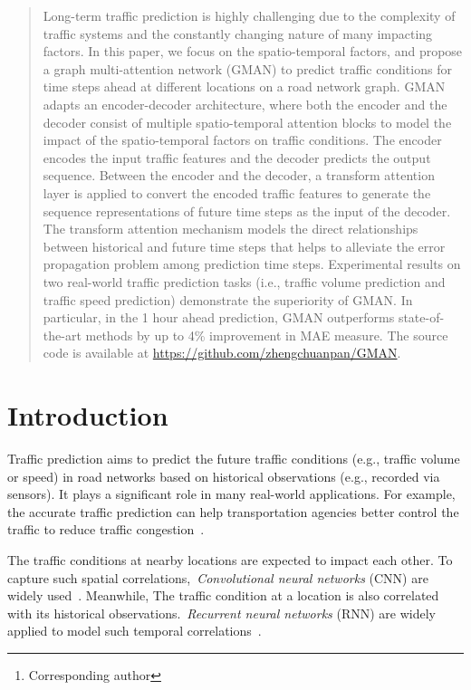 \documentclass[letterpaper]{article} \usepackage{aaai20}  \usepackage{times}  \usepackage{helvet} \usepackage{courier}  \usepackage[hyphens]{url}  \usepackage{graphicx} \usepackage{amsmath}
\author{Chuanpan Zheng\textsuperscript{\rm 1,2,3}, Xiaoliang Fan\textsuperscript{\rm 1,2,3}\thanks{Corresponding author}, Cheng Wang\textsuperscript{\rm 1,2,3}, Jianzhong Qi\textsuperscript{\rm 4}\\ \textsuperscript{\rm 1}Fujian Key Laboratory of Sensing and Computing for Smart Cities, Xiamen University, Xiamen, China\\
\textsuperscript{\rm 2}Digital Fujian Institute of Urban Traffic Big Data Research, Xiamen University, Xiamen, China\\ 
\textsuperscript{\rm 3}School of Informatics, Xiamen University, Xiamen, China\\ 
\textsuperscript{\rm 4}School of Computing and Information Systems, University of Melbourne, Melbourne, Australia\\zhengchuanpan@stu.xmu.edu.cn,
\{fanxiaoliang, cwang\}@xmu.edu.cn,
jianzhong.qi@unimelb.edu.au }
\begin{document}
	
\maketitle

\begin{abstract}
	Long-term traffic prediction is highly challenging due to the complexity of traffic systems and the constantly changing nature of many impacting factors. In this paper, we focus on the spatio-temporal factors, and propose a graph multi-attention network (GMAN) to predict traffic conditions for time steps ahead at different locations on a road network graph. GMAN adapts an encoder-decoder architecture, where both the encoder and the decoder consist of multiple spatio-temporal attention blocks to model the impact of the spatio-temporal factors on traffic conditions. The encoder encodes the input traffic features and the decoder predicts the output sequence. Between the encoder and the decoder, a transform attention layer is applied to convert the encoded traffic features to generate the sequence representations of future time steps as the input of the decoder. The transform attention mechanism models the direct relationships between historical and future time steps that helps to alleviate the error propagation problem among prediction time steps. Experimental results on two real-world traffic prediction tasks (i.e., traffic volume prediction and traffic speed prediction) demonstrate the superiority of GMAN. In particular, in the 1 hour ahead prediction, GMAN outperforms state-of-the-art methods by up to 4\% improvement in MAE measure. The source code is available at \url{https://github.com/zhengchuanpan/GMAN}.
\end{abstract}

\section{Introduction}

Traffic prediction aims to predict the future traffic conditions (e.g., traffic volume or speed) in road networks based on historical observations (e.g., recorded via sensors). It plays a significant role in many real-world applications. For example, the accurate traffic prediction can help transportation agencies better control the traffic to reduce traffic congestion~\cite{Lv-et-al:IJCAI2018,Zheng-et-al:TITS2019}.

The traffic conditions at nearby locations are expected to impact each other. To capture such spatial correlations,~\textit{Convolutional neural networks} (CNN) are widely used~\cite{Zhang-et-al:AAAI2017,Yao-et-al:AAAI2018,Yao-et-al:AAAI2019}. Meanwhile, The traffic condition at a location is also correlated with its historical observations.~\textit{Recurrent neural networks} (RNN) are widely applied to model such temporal correlations~\cite{Ma-et-al:TRC2015,Song-et-al:IJCAI2016}.            
\end{document}
